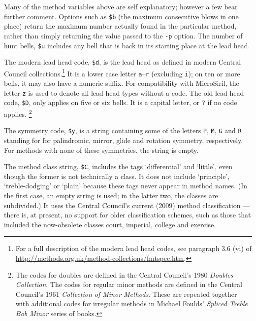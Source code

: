 \documentclass[a4paper,11pt,oneside]{book}
\makeatletter
\newcommand{\fspec}[1]{\index{#1@{\hspace*{-\fspecwidth}\texttt{\$#1}}}}
\makeatother
\begin{document}
Many of the method variables above are self explanatory; however a few
bear further comment.  Options such as \verb+$b+\fspec{b} (the maximum
consecutive blows in one place) return the maximum number actually found
in the particular method, rather than simply returning the value passed
to the \verb+-p+ option.  The number of hunt bells, \verb+$u+\fspec{u} 
includes any bell that is back in its starting place at the lead head.

The modern lead head code, \verb+$d+\fspec{d}, is the lead head as defined
in modern Central Council collections.\footnote{For a full description
of the modern lead head codes, see paragraph 3.6 (vi) of 
\url{http://methods.org.uk/method-collections/fmtspec.htm}.}
It is a lower case letter \verb+a+--\verb+r+ (excluding \verb+i+); 
on ten or more bells, it may also have a numeric suffix.  For compatibility
with MicroSiril, the letter \verb+z+ is used
to denote all lead head types without a code.  The old lead head code,
\verb+$D+\fspec{D}, only applies on five or six bells.  It is a capital
letter, or \verb+?+ if no code applies.%
\footnote{The codes for doubles are defined in the Central Council's
1980 \textit{Doubles Collection}.%
The codes for regular minor methods are defined in the Central Council's
1961 \textit{Collection of Minor Methods}.  These are
repeated together with additional codes for irregular methods in Michael
Foulds' \textit{Spliced Treble Bob Minor} series of books.%
}

The symmetry code, \verb+$y+\fspec{y}, is a string containing some of 
the letters \verb+P+, \verb+M+, \verb+G+ and \verb+R+ standing for
for palindromic, mirror, glide and rotation symmetry, respectively.  For
methods with none of these symmetries, the string is empty.

The method class string, \verb+$C+\fspec{C}, includes the tags `differential'
and `little', even though the former is not technically a class.  It does
not include `principle', `treble-dodging' or `plain' because these tags never
appear in method names.  (In the first case, an empty string is used; in 
the latter two, the classes are subdivided.)   It uses
the Central Council's current (2009) method classification%
 --- there is, at present, no support for 
older classification schemes, such as those that included the now-obsolete 
classes court, imperial, 
college and exercise.  
\end{document}
